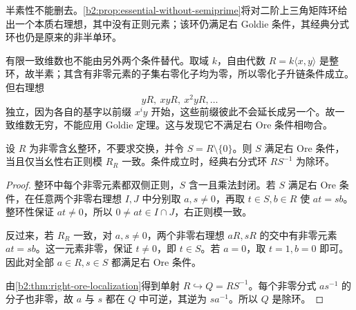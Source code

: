 \ProseParagraphBreak
半素性不能删去。\cref{b2:prop:essential-without-semiprime}将对二阶上三角矩阵环给出一个本质右理想，其中没有正则元素；该环仍满足右 Goldie 条件，其经典分式环也仍是原来的非半单环。

\ProseParagraphBreak
有限一致维数也不能由另外两个条件替代。取域 \(k\)，自由代数 \(R=k\langle x,y\rangle\) 是整环，故半素；其含有非零元素的子集右零化子均为零，所以零化子升链条件成立。但右理想
\[
	yR,\ xyR,\ x^2yR,\ldots
\]
独立，因为各自的基字以前缀 \(x^iy\) 开始，这些前缀彼此不会延长成另一个。故一致维数无穷，不能应用 Goldie 定理。这与发现它不满足右 Ore 条件相吻合。

\begin{corollary}\label{b2:cor:domain-uniform-ore}
	设 \(R\) 为非零含幺整环，不要求交换，并令 \(S=R\setminus\{0\}\)。则 \(S\) 满足右 Ore 条件，当且仅当幺性右正则模 \(R_R\) 一致。条件成立时，经典右分式环 \(RS^{-1}\) 为除环。
\end{corollary}
\begin{proof}
	整环中每个非零元素都双侧正则，\(S\) 含一且乘法封闭。若 \(S\) 满足右 Ore 条件，在任意两个非零右理想 \(I,J\) 中分别取 \(a,s\ne0\)，再取 \(t\in S,b\in R\) 使 \(at=sb\)。整环性保证 \(at\ne0\)，所以 \(0\ne at\in I\cap J\)，右正则模一致。

	反过来，若 \(R_R\) 一致，对 \(a,s\ne0\)，两个非零右理想 \(aR,sR\) 的交中有非零元素 \(at=sb\)。这一元素非零，保证 \(t\ne0\)，即 \(t\in S\)。若 \(a=0\)，取 \(t=1,b=0\) 即可。因此对全部 \(a\in R,s\in S\) 都满足右 Ore 条件。

	由\cref{b2:thm:right-ore-localization}得到单射 \(R\hookrightarrow Q=RS^{-1}\)。每个非零分式 \(as^{-1}\) 的分子也非零，故 \(a\) 与 \(s\) 都在 \(Q\) 中可逆，其逆为 \(sa^{-1}\)。所以 \(Q\) 是除环。
\end{proof}

